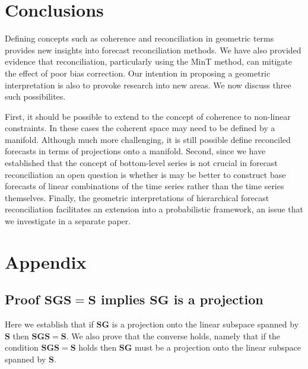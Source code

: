 \documentclass[12pt]{article}
\theoremstyle{definition}
\theoremstyle{property}
\begin{document}
	
	
	
\section{Conclusions} \label{sec:conclusions}
	
	
	Defining concepts such as coherence and reconciliation in geometric terms provides new insights into forecast reconciliation methods.  We have also provided evidence that reconciliation, particularly using the MinT method, can mitigate the effect of poor bias correction.  Our intention in proposing a geometric interpretation is also to provoke research into new areas.  We now discuss three such possibilites.
	
	First, it should be possible to extend to the concept of coherence to non-linear constraints.  In these cases the coherent space may need to be defined by a manifold.  Although much more challenging, it is still possible define reconciled forecasts in terms of projections onto a manifold.  Second, since we have established that the concept of bottom-level series is not crucial in forecast reconciliation an open question is whether is may be better to construct base forecasts of linear combinations of the time series rather than the time series themselves.  Finally, the geometric interpretations of hierarchical forecast reconciliation facilitates an extension into a probabilistic framework, an issue that we investigate in a separate paper.  	
	
	
	\section{Appendix}
	\subsection{Proof $\bm{S}\bm{G}\bm{S}=\bm{S}$ implies $\bm{S}\bm{G}$ is a projection}
	Here we establish that if $\bm{S}\bm{G}$ is a projection onto the linear subspace spanned by $\bm{S}$ then $\bm{S}\bm{G}\bm{S}=\bm{S}$.  We also prove that the converse holds, namely that if the condition $\bm{S}\bm{G}\bm{S}=\bm{S}$ holds then $\bm{S}\bm{G}$ must be a projection onto the linear subspace spanned by $\bm{S}$.
	
\end{document}
